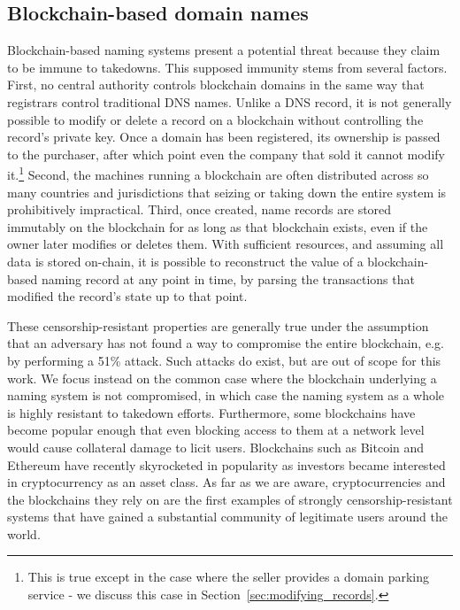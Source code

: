 \subsection{Blockchain-based domain names}

Blockchain-based naming systems present a potential threat 
because they claim to be immune to takedowns. This supposed immunity stems 
from several factors. 
First, no central authority 
controls blockchain domains in the same way that registrars 
control traditional DNS names. Unlike a DNS record, it is not generally 
possible 
to modify or delete a record on a blockchain without controlling the record's 
private key. Once a domain has been registered, its ownership is passed to the 
purchaser, after which 
point even the company that 
sold it cannot modify it.\footnote{This is true except in the case where the 
seller provides a domain parking service - we discuss this case in 	
Section~\ref{sec:modifying_records}.}
Second, the machines running a blockchain are often distributed across so many 
countries and jurisdictions that seizing or taking down the entire system is 
prohibitively impractical. 
Third, once created, name records are stored immutably on the 
blockchain for as long as that blockchain exists, even if the owner later 
modifies or deletes them. With sufficient resources, and assuming all data is 
stored on-chain, it is possible to reconstruct the value of a 
blockchain-based naming record at any point in time, by parsing the 
transactions that modified the record's state up to that point.

These censorship-resistant properties are generally true under the assumption 
that an adversary has not found a way to compromise the entire blockchain, e.g. 
by performing a 51\% attack. Such 
attacks do exist, but are out of scope for this work. We focus instead on the 
common case where the blockchain underlying a naming system is not compromised, 
in which case the naming system as a whole is highly resistant to takedown 
efforts. Furthermore, some blockchains have become popular enough that even 
blocking access to them at a network level would cause collateral damage to 
licit users. Blockchains such as Bitcoin and Ethereum have recently 
skyrocketed in popularity as investors became interested in cryptocurrency as 
an asset class. As far as we are aware, cryptocurrencies and the blockchains 
they rely on are the first examples of strongly censorship-resistant systems 
that have gained a substantial community of legitimate users around the world.

